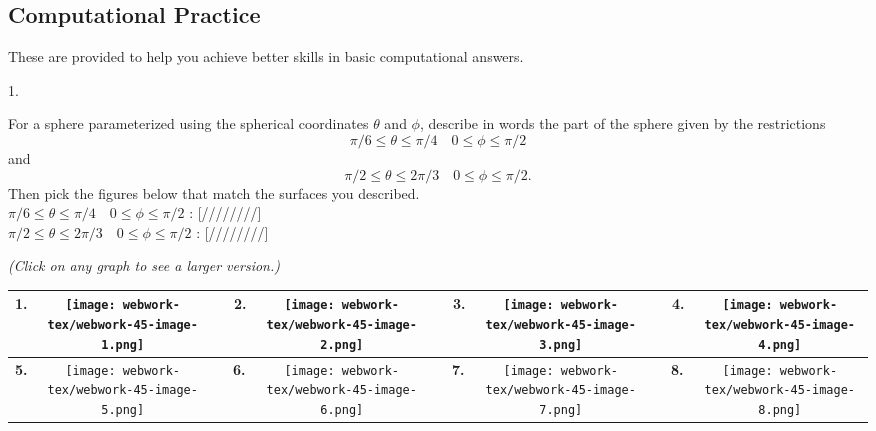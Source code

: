 \documentclass[10pt,]{book}
\theoremstyle{plain}
\theoremstyle{definition}
\theoremstyle{definition}
\theoremstyle{definition}
\theoremstyle{definition}
\theoremstyle{definition}
\numberwithin{equation}{section}
\begin{document}
\subsection[{Computational Practice}]{Computational Practice}\label{exercises-10}
These are provided to help you achieve better skills in basic computational answers.%
\begin{exerciselist}
\item[1.]\hypertarget{exercise-45}{}\mbox{}\\ %
\begin{mdframed}
{
For a sphere parameterized using the spherical coordinates
\(\theta\) and \(\phi\), describe in words the part of the sphere
given by the restrictions
\[\pi/6 \leq\theta\le \pi/4 \quad 0\le\phi\leq \pi/2\]
and
\[\pi/2 \leq\theta\le 2\pi/3 \quad 0\le\phi\leq \pi/2.\]
Then pick the figures below that match the surfaces you described.
\leavevmode\\\relax 
\(\pi/6 \leq\theta\le \pi/4 \quad 0\le\phi\leq \pi/2\) :
[////////]
\leavevmode\\\relax 
\(\pi/2 \leq\theta\le 2\pi/3 \quad 0\le\phi\leq \pi/2\) :
[////////]
\par 
\begin{center} 
{\it (Click on any graph to see a larger version.)} 
\leavevmode\\\relax 

\par\smallskip\begin{center}\begin{tabular}{|c|c|c|c|c|c|c|c|} \hline

{\bf 1.} &\texttt{[image: webwork-tex/webwork-45-image-1.png]}
 &\ \ {\bf 2.} &\texttt{[image: webwork-tex/webwork-45-image-2.png]}
 &\ \ {\bf 3.} &\texttt{[image: webwork-tex/webwork-45-image-3.png]}
 &\ \ {\bf 4.} &\texttt{[image: webwork-tex/webwork-45-image-4.png]}
 \\ \hline 

{\bf 5.} &\texttt{[image: webwork-tex/webwork-45-image-5.png]}
 &\ \ {\bf 6.} &\texttt{[image: webwork-tex/webwork-45-image-6.png]}
 &\ \ {\bf 7.} &\texttt{[image: webwork-tex/webwork-45-image-7.png]}
 &\ \ {\bf 8.} &\texttt{[image: webwork-tex/webwork-45-image-8.png]}
 \\ \hline 


\end {tabular}\end{center}\par\smallskip


\end{center}}
\end{mdframed}
\end{exerciselist}
\end{document}
